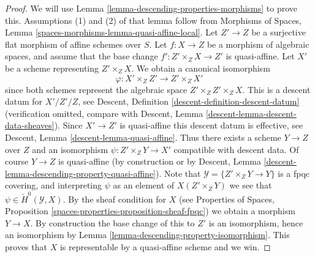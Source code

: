 \documentclass[10pt,a4paper]{amsart}
\theoremstyle{plain}
\theoremstyle{definition}
\theoremstyle{remark}
\numberwithin{equation}{subsection}
\begin{document}
\begin{proof}
We will use
Lemma \ref{lemma-descending-properties-morphisms}
to prove this. Assumptions (1) and (2) of that lemma follow from
Morphisms of Spaces,
Lemma \ref{spaces-morphisms-lemma-quasi-affine-local}.
Let $Z' \to Z$ be a surjective flat morphism of affine schemes over $S$.
Let $f : X \to Z$ be a morphism of algebraic spaces, and assume
that the base change $f' : Z' \times_Z X \to Z'$ is quasi-affine.
Let $X'$ be a scheme representing $Z' \times_Z X$.
We obtain a canonical isomorphism
$$
\varphi : X' \times_Z Z' \longrightarrow Z' \times_Z X'
$$
since both schemes represent the algebraic space $Z' \times_Z Z' \times_Z X$.
This is a descent datum for $X'/Z'/Z$, see
Descent, Definition \ref{descent-definition-descent-datum}
(verification omitted, compare with
Descent, Lemma \ref{descent-lemma-descent-data-sheaves}).
Since $X' \to Z'$ is quasi-affine this descent datum is effective, see
Descent, Lemma \ref{descent-lemma-quasi-affine}.
Thus there exists a scheme $Y \to Z$ over $Z$ and an
isomorphism $\psi : Z' \times_Z Y \to X'$ compatible with descent data.
Of course $Y \to Z$ is quasi-affine (by construction or by
Descent, Lemma \ref{descent-lemma-descending-property-quasi-affine}).
Note that $\mathcal{Y} = \{Z' \times_Z Y \to Y\}$ is a
fpqc covering, and interpreting $\psi$ as an element of
$X(Z' \times_Z Y)$ we see that $\psi \in \check{H}^0(\mathcal{Y}, X)$.
By the sheaf condition for $X$ (see
Properties of Spaces, Proposition
\ref{spaces-properties-proposition-sheaf-fpqc})
we obtain a morphism $Y \to X$.
By construction the base change of this to $Z'$ is an isomorphism, hence
an isomorphism by
Lemma \ref{lemma-descending-property-isomorphism}.
This proves that $X$ is representable by a quasi-affine scheme and we win.
\end{proof}
\end{document}
